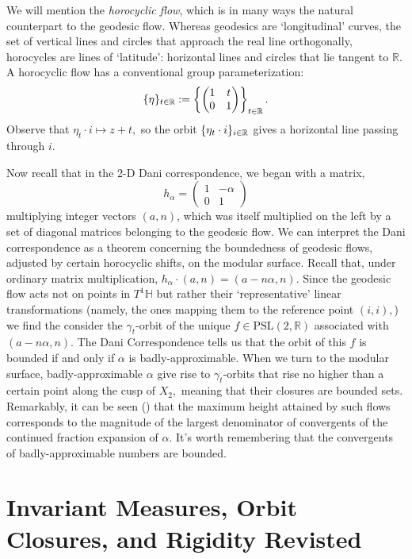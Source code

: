 \documentclass[12pt, letterpaper, oneside]{book}
\newcommand{\ga}{\ensuremath{\alpha}}
\renewcommand{\gg}{\ensuremath{\gamma}}
\newcommand{\Hyp}{\mathbb{H}}
\newcommand{\R}{\mathbb{R}}
\DeclarePairedDelimiter{\set}{\lbrace}{\rbrace}
\theoremstyle{plain}
\theoremstyle{definition}
\theoremstyle{remark}
\begin{document}
We will mention the \textit{horocyclic flow}, which is in many ways the natural counterpart to the geodesic flow. Whereas geodesics are `longitudinal' curves, the set of vertical lines and circles that approach the real line orthogonally, horocycles are lines of `latitude': horizontal lines and circles that lie tangent to $\R.$ A horocyclic flow has a conventional group parameterization:
\[
\set{\eta}_{t\in \R} := \left \{ \begin{pmatrix} 1 & t \\ 0 & 1 \end{pmatrix} \right \}_{t \in \R}.
\]
Observe that $\eta_t \cdot i \mapsto z + t,$ so the orbit $\set{\eta_t \cdot i}_{i \in \R}$ gives a horizontal line passing through $i.$ 

Now recall that in the 2-D Dani correspondence, we began with a matrix, 
\[
h_\ga = \begin{pmatrix} 1 & -\ga \\ 0 & 1 \end{pmatrix}
\]
multiplying integer vectors $(a,n)$, which was itself multiplied on the left by a set of diagonal matrices belonging to the geodesic flow. We can interpret the Dani correspondence as a theorem concerning the boundedness of geodesic flows, adjusted by certain horocyclic shifts, on the modular surface. Recall that, under ordinary matrix multiplication, $h_\ga \cdot (a,n) = (a - n\ga, n).$ Since the geodesic flow acts not on points in $T^1\Hyp$ but rather their `representative' linear transformations (namely, the ones mapping them to the reference point $(i, i),$) we find the consider the $\gg_t$-orbit of the unique $f \in \mbox{PSL}(2,\R)$ associated with $(a - n\ga, n).$ The Dani Correspondence tells us that the orbit of this $f$ is bounded if and only if $\ga$ is badly-approximable. When we turn to the modular surface, badly-approximable $\ga$ give rise to $\gg_t$-orbits that rise no higher than a certain point along the cusp of $X_2,$ meaning that their closures are bounded sets. Remarkably, it can be seen (\cite{Kle98}) that the maximum height attained by such flows corresponds to the magnitude of the largest denominator of convergents of the continued fraction expansion of $\ga.$ It's worth remembering that the convergents of badly-approximable numbers are bounded.  

\section{Invariant Measures, Orbit Closures, and Rigidity Revisted}
\end{document}
